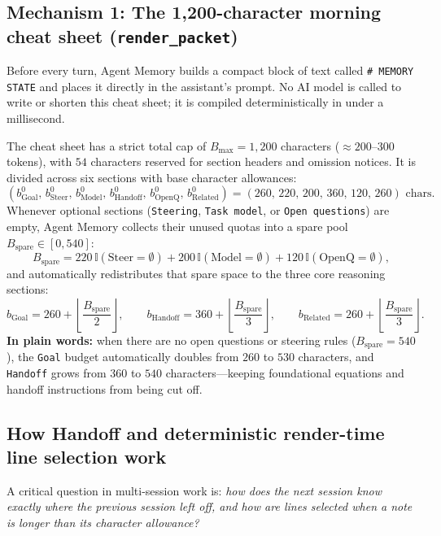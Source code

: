 \documentclass[11pt,a4paper]{article}
\begin{document}
\subsection{Mechanism 1: The 1{,}200-character morning cheat sheet (\texttt{render\_packet})}

Before every turn, Agent Memory builds a compact block of text called \texttt{\# MEMORY STATE} and places it directly in the assistant's prompt. No AI model is called to write or shorten this cheat sheet; it is compiled deterministically in under a millisecond.

\begin{mathbox}
The cheat sheet has a strict total cap of $B_{\max} = 1{,}200$ characters ($\approx 200$--$300$ tokens), with $54$ characters reserved for section headers and omission notices. It is divided across six sections with base character allowances:
\[
  (b_{\text{Goal}}^0,\, b_{\text{Steer}}^0,\, b_{\text{Model}}^0,\, b_{\text{Handoff}}^0,\, b_{\text{OpenQ}}^0,\, b_{\text{Related}}^0)
  = (260,\, 220,\, 200,\, 360,\, 120,\, 260)\text{ chars.}
\]
Whenever optional sections (\texttt{Steering}, \texttt{Task model}, or \texttt{Open questions}) are empty, Agent Memory collects their unused quotas into a spare pool $B_{\text{spare}} \in [0, 540]$:
\[
  B_{\text{spare}} = 220\,\mathbb{I}(\text{Steer}=\emptyset) + 200\,\mathbb{I}(\text{Model}=\emptyset) + 120\,\mathbb{I}(\text{OpenQ}=\emptyset),
\]
and automatically redistributes that spare space to the three core reasoning sections:
\[
  b_{\text{Goal}} = 260 + \left\lfloor \frac{B_{\text{spare}}}{2} \right\rfloor, \qquad
  b_{\text{Handoff}} = 360 + \left\lfloor \frac{B_{\text{spare}}}{3} \right\rfloor, \qquad
  b_{\text{Related}} = 260 + \left\lfloor \frac{B_{\text{spare}}}{3} \right\rfloor.
\]
\textbf{In plain words:} when there are no open questions or steering rules ($B_{\text{spare}}=540$), the \texttt{Goal} budget automatically doubles from $260$ to $530$ characters, and \texttt{Handoff} grows from $360$ to $540$ characters---keeping foundational equations and handoff instructions from being cut off.
\end{mathbox}

\subsection{How Handoff and deterministic render-time line selection work}

A critical question in multi-session work is: \emph{how does the next session know exactly where the previous session left off, and how are lines selected when a note is longer than its character allowance?}
\end{document}
